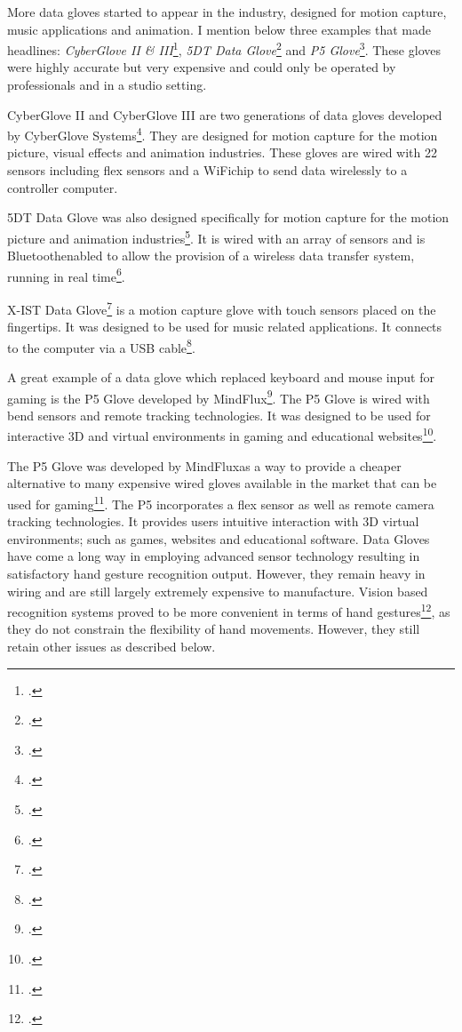 More data gloves started to appear in the industry, designed for motion capture, music applications and animation. I mention below three examples that made headlines: \textit{CyberGlove II \& III}\footcite{CyberGloveII}, \textit{5DT Data Glove}\footcite{5DTech} and \textit{P5 Glove}\footcite{P5Glove}. These gloves were highly accurate but very expensive and could only be operated by professionals and in a studio setting.

CyberGlove II and CyberGlove III are two generations of data gloves developed by CyberGlove Systems\footcite{CyberGloveII}. They are designed for motion capture for the motion picture, visual effects and animation industries. These gloves are wired with 22 sensors including flex sensors and a WiFi\texttrademark chip to send data wirelessly to a controller computer. 

5DT Data Glove was also designed specifically for motion capture for the motion picture and animation industries\footcite{5DTech}. It is wired with an array of sensors and is Bluetooth\texttrademark enabled to allow the provision of a wireless data transfer system, running in real time\footcite{5DTech}. 

X-IST Data Glove\footcite{XISTDataGlove} is a motion capture glove with touch sensors placed on the fingertips. It was designed to be used for music related applications. It connects to the computer via a USB cable\footcite{XISTDataGlove}. 

A great example of a data glove which replaced keyboard and mouse input for gaming is the P5 Glove developed by MindFlux\footcite{P5Glove}. The P5 Glove is wired with bend sensors and remote tracking technologies. It was designed to be used for interactive 3D and virtual environments in gaming and educational websites\footcite{P5Glove}. 

The P5 Glove was developed by MindFlux\texttrademark as a way to provide a cheaper alternative to many expensive wired gloves available in the market that can be used for gaming\footcite{P5Glove}. The P5 incorporates a flex sensor as well as remote camera tracking technologies. It provides users intuitive interaction with 3D virtual environments; such as games, websites and educational software. Data Gloves have come a long way in employing advanced sensor technology resulting in satisfactory hand gesture recognition output. However, they remain heavy in wiring and are still largely extremely expensive to manufacture. Vision based recognition systems proved to be more convenient in terms of hand gestures\footcite{Lamberti2012}, as they do not constrain the flexibility of hand movements. However, they still retain other issues as described below.

